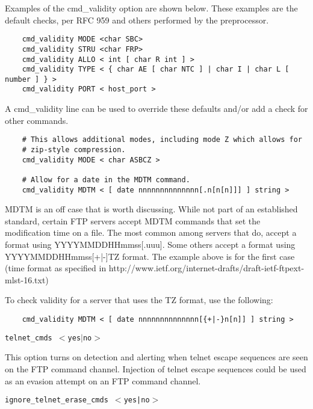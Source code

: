\documentclass[english]{report}
\newcounter{slistnum}
\newenvironment{slist}
{ \begin{list}{ {\bf \arabic{slistnum}.} }{\usecounter{slistnum} } }
{ \end{list} }
\begin{document}
\begin{slist}
\begin{center}
\begin{tabular}{| l | p{3in} |}
\hline
\end{tabular}
\end{center}

Examples of the cmd\_validity option are shown below.  These examples are the
default checks, per RFC 959 and others performed by the preprocessor.

\begin{verbatim}
    cmd_validity MODE <char SBC>
    cmd_validity STRU <char FRP>
    cmd_validity ALLO < int [ char R int ] >
    cmd_validity TYPE < { char AE [ char NTC ] | char I | char L [ number ] } >
    cmd_validity PORT < host_port >
\end{verbatim}

A cmd\_validity line can be used to override these defaults and/or add a check
for other commands.

\begin{verbatim}
    # This allows additional modes, including mode Z which allows for
    # zip-style compression.
    cmd_validity MODE < char ASBCZ >
    
    # Allow for a date in the MDTM command.
    cmd_validity MDTM < [ date nnnnnnnnnnnnnn[.n[n[n]]] ] string >
\end{verbatim}

MDTM is an off case that is worth discussing.  While not part of an established
standard, certain FTP servers accept MDTM commands that set the modification
time on a file.  The most common among servers that do, accept a format using
YYYYMMDDHHmmss[.uuu].  Some others accept a format using YYYYMMDDHHmmss[+|-]TZ
format.  The example above is for the first case (time format as specified in
http://www.ietf.org/internet-drafts/draft-ietf-ftpext-mlst-16.txt)

To check validity for a server that uses the TZ format, use the following:

\begin{verbatim}
    cmd_validity MDTM < [ date nnnnnnnnnnnnnn[{+|-}n[n]] ] string >
\end{verbatim}

\item \texttt{telnet\_cmds $<$yes$|$no$>$}

This option turns on detection and alerting when telnet escape sequences are
seen on the FTP command channel.  Injection of telnet escape sequences could be
used as an evasion attempt on an FTP command channel.

\item \texttt{ignore\_telnet\_erase\_cmds $<$yes|no$>$}


\end{slist}
\end{document}
